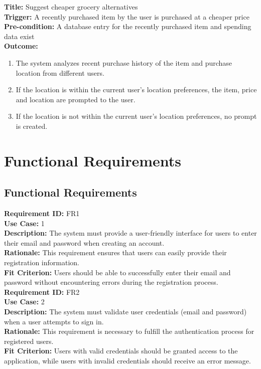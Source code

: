 \documentclass[12pt]{article}
\begin{document}
\medskip
\noindent \textbf{Title:} Suggest cheaper grocery alternatives\\
\textbf{Trigger:} A recently purchased item by the user is purchased at a cheaper price\\
\textbf{Pre-condition:} A database entry for the recently purchased item and spending data exist\\
\textbf{Outcome:}
\begin{enumerate}
  \item The system analyzes recent purchase history of the item and purchase location from different users.
  \item If the location is within the current user's location preferences, the item, price and location are
  prompted to the user.
  \item If the location is not within the current user's location preferences, no prompt is created.
\end{enumerate}

\section{Functional Requirements}
\subsection{Functional Requirements}
\medskip
\noindent \textbf{Requirement ID:} FR1\\
\textbf{Use Case:} 1\\
\textbf{Description:} The system must provide a user-friendly interface for users to enter their email and password when creating an account.\\
\textbf{Rationale:} This requirement ensures that users can easily provide their registration information.\\
\textbf{Fit Criterion:} Users should be able to successfully enter their email and password without encountering errors during the registration process.\\

\medskip
\noindent \textbf{Requirement ID:} FR2\\
\textbf{Use Case:} 2\\
\textbf{Description:} The system must validate user credentials (email and password) when a user attempts to sign in.\\
\textbf{Rationale:} This requirement is necessary to fulfill the authentication process for registered users.\\
\textbf{Fit Criterion:} Users with valid credentials should be granted access to the application, while users with invalid credentials should receive an error message.\\
\end{document}
